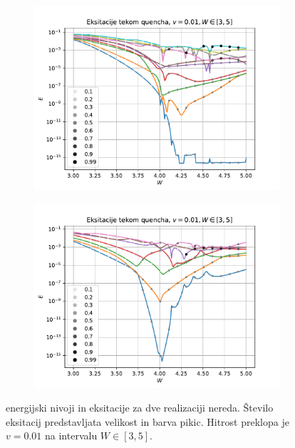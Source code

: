 \begin{figure}[H]
\centering
\begin{subfigure}{.49\textwidth}
\includegraphics[trim=0 0 0 38,clip,width=\linewidth]{Figures/EksTekom1.pdf}
\end{subfigure}
\begin{subfigure}{.49\textwidth}
\includegraphics[trim=0 0 0 38,clip,width=\linewidth]{Figures/EksTekom2.pdf}
\end{subfigure}
\caption{energijski nivoji in eksitacije za dve realizaciji nereda. Število eksitacij predstavljata velikost in barva pikic. Hitrost preklopa je $v=0.01$ na intervalu $W \in [3,5]$.}
\label{fig:EksTekom}
\end{figure}

